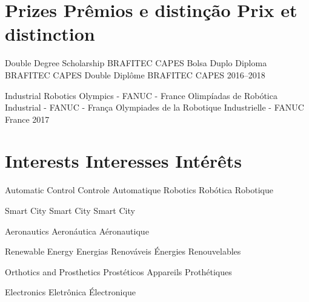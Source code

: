 \section{
  \ml
  {Prizes}
  {Prêmios e distinção}
  {Prix et distinction}
}

{
  \ml
  {Double Degree Scholarship BRAFITEC CAPES}
  {Bolsa Duplo Diploma BRAFITEC CAPES}
  {Double Diplôme BRAFITEC CAPES} 2016--2018
}

{
  \ml
  {Industrial Robotics Olympics - FANUC - France}
  {Olimpíadas de Robótica Industrial - FANUC - França}
  {Olympiades de la Robotique Industrielle - FANUC France} 2017
}

\section{
  \ml
  {Interests}
  {Interesses}
  {Intérêts}
}

\renewcommand{\listitemsymbol}{-~} %
\cvlistdoubleitem
{
  \ml
  {Automatic Control}
  {Controle}
  {Automatique}
}
{
  \ml
  {Robotics}
  {Robótica}
  {Robotique}
}


{
    \ml
  {Smart City}
  {Smart City}
  {Smart City}
}

{
  \ml
  {Aeronautics}
  {Aeronáutica}
  {Aéronautique}
}

{
  \ml
  {Renewable Energy}
  {Energias Renováveis}
  {Énergies Renouvelables}
}


{
  \ml
  {Orthotics and Prosthetics}
  {Prostéticos}
  {Appareils Prothétiques}
}

{
  \ml
  {Electronics}
  {Eletrônica}
  {Électronique}
}

